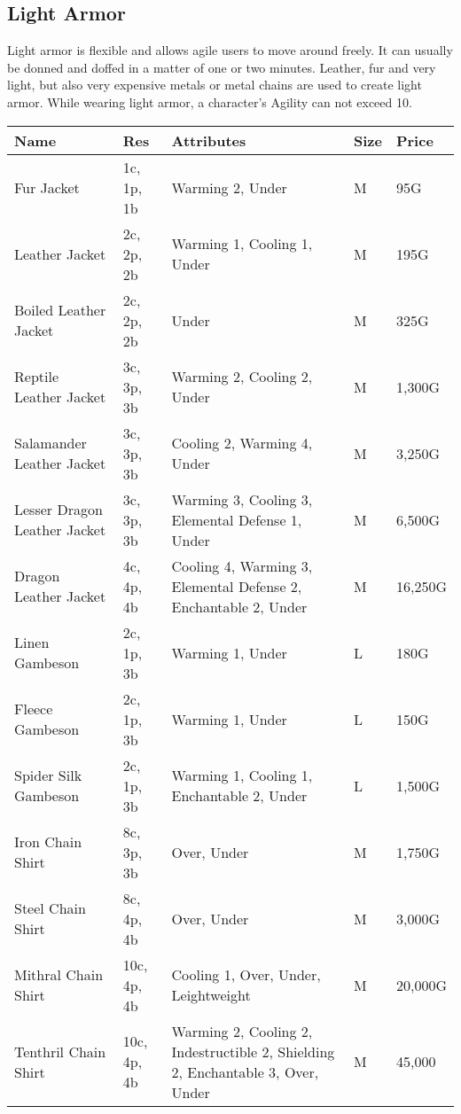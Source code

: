 \subsection{Light Armor}\label{subsec:lightArmor}

Light armor is flexible and allows agile users to move around freely.
It can usually be donned and doffed in a matter of one or two minutes.
Leather, fur and very light, but also very expensive metals or metal chains are used to create light armor.
While wearing light armor, a character's Agility can not exceed 10.

\begin{longtable}{p{3.5cm} | p{1.5cm} | p{5cm} | p{1cm} | p{1.25cm}}
	Name & Res &  Attributes & Size & Price\\ \hline
	Fur Jacket & 1c, 1p, 1b & Warming 2, Under & M & 95G\\
	
	Leather Jacket & 2c, 2p, 2b & Warming 1, Cooling 1, Under & M & 195G\\
	
	Boiled Leather Jacket & 2c, 2p, 2b & Under & M & 325G\\
	
	Reptile Leather Jacket & 3c, 3p, 3b & Warming 2, Cooling 2, Under & M & 1,300G\\
	
	Salamander Leather Jacket & 3c, 3p, 3b & Cooling 2, Warming 4, Under & M & 3,250G\\
	
	Lesser Dragon Leather Jacket & 3c, 3p, 3b & Warming 3, Cooling 3, Elemental Defense 1, Under & M & 6,500G\\
	
	Dragon Leather Jacket & 4c, 4p, 4b & Cooling 4, Warming 3, Elemental Defense 2, Enchantable 2, Under & M & 16,250G\\
	
	Linen Gambeson & 2c, 1p, 3b & Warming 1, Under & L & 180G\\
	
	Fleece Gambeson & 2c, 1p, 3b & Warming 1, Under & L & 150G\\
	
	Spider Silk Gambeson & 2c, 1p, 3b & Warming 1, Cooling 1, Enchantable 2, Under & L & 1,500G\\
	
	Iron Chain Shirt & 8c, 3p, 3b & Over, Under & M & 1,750G\\
	
	Steel Chain Shirt & 8c, 4p, 4b & Over, Under & M & 3,000G\\
	
	Mithral Chain Shirt & 10c, 4p, 4b & Cooling 1, Over, Under, Leightweight & M & 20,000G\\
	
	Tenthril Chain Shirt & 10c, 4p, 4b & Warming 2, Cooling 2, Indestructible 2, Shielding 2, Enchantable 3, Over, Under & M & 45,000\\
\end{longtable}